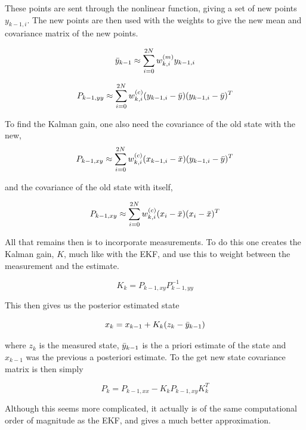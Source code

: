 These points are sent through the nonlinear function, giving a set of new points $y_{k-1,i}$. The new points are then used with the weights to give the new mean and covariance matrix of the new points. 


\begin{equation}
    \Bar{y}_{k-1} \approx \sum_{i=0}^{2N} w_{k,i}^{(m)}y_{k-1,i}
\end{equation}

\begin{equation}
    P_{k-1, yy} \approx \sum_{i=0}^{2N} w_{k,i}^{(c)}(y_{k-1,i} - \Bar{y})(y_{k-1,i} - \Bar{y})^T
\end{equation}

To find the Kalman gain, one also need the covariance of the old state with the new, 
\begin{equation}
    P_{k-1, xy} \approx \sum_{i=0}^{2N} w_{k,i}^{(c)}(x_{k-1,i} - \Bar{x})(y_{k-1,i} - \Bar{y})^T
\end{equation}

and the covariance of the old state with itself,

\begin{equation}
    P_{k-1,xy} \approx \sum_{i=0}^{2N}w_{k,i}^{(c)}(x_i - \Bar{x})(x_i - \Bar{x})^T
\end{equation}

All that remains then is to incorporate measurements. To do this one creates the Kalman gain, $K$, much like with the EKF, and use this to weight between the measurement and the estimate.

\begin{equation}
    K_k = P_{k-1,xy}P_{k-1,yy}^{-1}
\end{equation}

This then gives us the posterior estimated state

\begin{equation}
    x_k = x_{k-1} + K_k(z_k - \Bar{y}_{k-1})
\end{equation}

where $z_k$ is the measured state, $\Bar{y}_{k-1}$ is the a priori estimate of the state and $x_{k-1}$ was the previous a posteriori estimate. To the get new state covariance matrix is then simply

\begin{equation}
    P_k = P_{k-1,xx} - K_kP_{k-1,xy}K_k^T
\end{equation}

Although this seems more complicated, it actually is of the same computational order of magnitude as the EKF, and gives a much better approximation.

